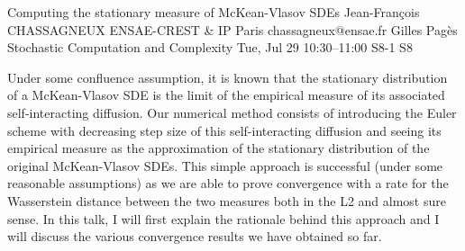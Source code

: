 \documentclass[12pt,lettersize,oneside]{book} %
\begin{document}
\begin{talk}
  {Computing the stationary measure of McKean-Vlasov SDEs}%
  {Jean-Fran\c{c}ois CHASSAGNEUX}%
  {ENSAE-CREST \& IP Paris}%
  {chassagneux@ensae.fr}%
  {Gilles Pag\`es}%
  {Stochastic Computation and Complexity}%
  {Tue, Jul 29 10:30--11:00}%
  {S8-1}%
  {S8}%
    
   
Under some confluence assumption, it is known that the stationary distribution of a McKean-Vlasov SDE is the limit of the empirical measure of its associated self-interacting diffusion. 
Our numerical method consists of introducing the Euler scheme with decreasing step size of this self-interacting diffusion and seeing its empirical measure as the approximation of the stationary distribution of the original McKean-Vlasov SDEs.
This simple approach is successful (under some reasonable assumptions) as we are able to prove convergence with a rate for the Wasserstein distance between the two measures both in the L2 and almost sure sense. In this talk, I will first explain the rationale behind this approach and  I will discuss the various convergence results we have obtained so far.





\end{talk}
\end{document}

